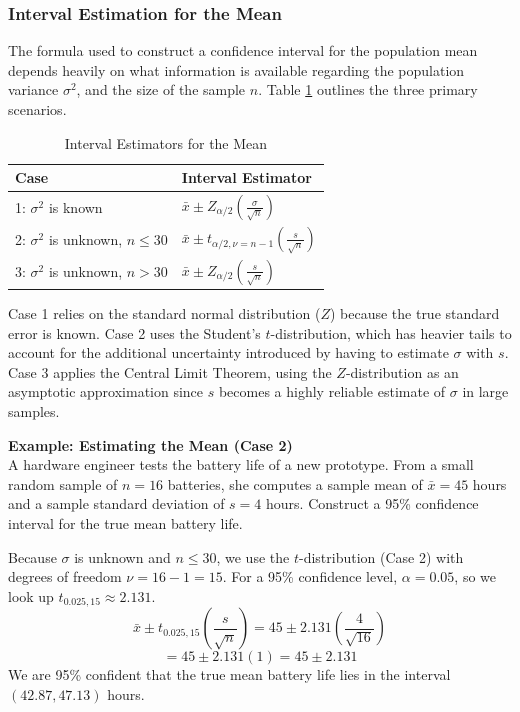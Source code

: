 \documentclass{article}
\begin{document}
\subsubsection{Interval Estimation for the Mean}

The formula used to construct a confidence interval for the population mean depends heavily on what information is available regarding the population variance $\sigma^2$, and the size of the sample $n$. Table \ref{tab:intervals} outlines the three primary scenarios.

\begin{table}[h]
\centering
\begin{tabular}{ll}
\hline
\textbf{Case} & \textbf{Interval Estimator} \\ \hline
1: $\sigma^2$ is known & $\bar{x} \pm Z_{\alpha/2} \left( \frac{\sigma}{\sqrt{n}} \right)$ \\
2: $\sigma^2$ is unknown, $n \leq 30$ & $\bar{x} \pm t_{\alpha/2, \nu=n-1} \left( \frac{s}{\sqrt{n}} \right)$ \\
3: $\sigma^2$ is unknown, $n > 30$ & $\bar{x} \pm Z_{\alpha/2} \left( \frac{s}{\sqrt{n}} \right)$ \\ 
\hline \hline
\end{tabular}
\caption{\label{tab:intervals} Interval Estimators for the Mean}
\end{table}

Case 1 relies on the standard normal distribution ($Z$) because the true standard error is known. Case 2 uses the Student's $t$-distribution, which has heavier tails to account for the additional uncertainty introduced by having to estimate $\sigma$ with $s$. Case 3 applies the Central Limit Theorem, using the $Z$-distribution as an asymptotic approximation since $s$ becomes a highly reliable estimate of $\sigma$ in large samples.

\textbf{Example: Estimating the Mean (Case 2)} \\
A hardware engineer tests the battery life of a new prototype. From a small random sample of $n=16$ batteries, she computes a sample mean of $\bar{x}=45$ hours and a sample standard deviation of $s=4$ hours. Construct a 95\% confidence interval for the true mean battery life.

Because $\sigma$ is unknown and $n \leq 30$, we use the $t$-distribution (Case 2) with degrees of freedom $\nu = 16 - 1 = 15$. For a 95\% confidence level, $\alpha=0.05$, so we look up $t_{0.025, 15} \approx 2.131$.
$$\bar{x} \pm t_{0.025, 15} \left( \frac{s}{\sqrt{n}} \right) = 45 \pm 2.131 \left( \frac{4}{\sqrt{16}} \right)$$
$$= 45 \pm 2.131(1) = 45 \pm 2.131$$
We are 95\% confident that the true mean battery life lies in the interval $(42.87, 47.13)$ hours.
\end{document}
